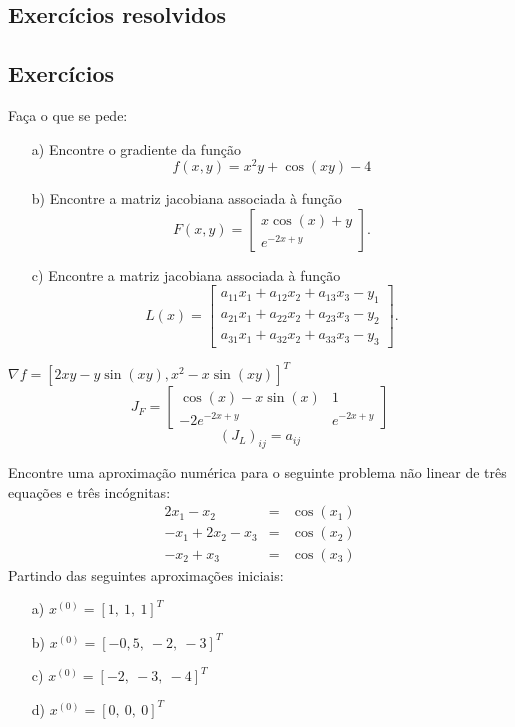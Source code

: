 
\fi

\subsection*{Exercícios resolvidos}

\construirExeresol

\subsection*{Exercícios}

\begin{exer} Faça o que se pede:
\begin{itemize}
\item[a)] Encontre o gradiente da função $$f(x,y)=x^2y+\cos(xy)-4$$
\item[b)] Encontre a matriz jacobiana associada à função
$$F(x,y)=\left[\begin{array}{c}x\cos(x)+y\\ e^{-2x+y}\end{array} \right].$$
\item[c)] Encontre a matriz jacobiana associada à função
$$L(x)=\left[\begin{array}{c}
a_{11}x_1 + a_{12}x_2 +a_{13}x_3-y_1\\
a_{21}x_1 + a_{22}x_2 +a_{23}x_3-y_2\\
a_{31}x_1 + a_{32}x_2 +a_{33}x_3-y_3
\end{array}
 \right].$$
\end{itemize}
\end{exer}
\begin{resp}
$\nabla f = [2xy-y\sin(xy), x^2-x\sin(xy)]^T$
$$J_F=\left[\begin{array}{cc}
\cos(x)-x\sin(x) & 1\\
-2e^{-2x+y} &e^{-2x+y}
\end{array}
\right]$$
$$\left(J_L\right)_{ij}=a_{ij}$$
\end{resp}

\begin{exer} Encontre uma aproximação numérica para o seguinte problema não linear de três equações e três incógnitas:
\begin{eqnarray*}
2x_1-x_2&=&\cos(x_1)\\
-x_1+2x_2-x_3&=&\cos(x_2)\\
-x_2+	x_3&=&\cos(x_3)
\end{eqnarray*}
Partindo das seguintes aproximações iniciais:
\begin{itemize}
\item[a)] $x^{(0)}=[1,~1,~1]^T$
\item[b)] $x^{(0)}=[-0,5,~-2,~-3]^T$
\item[c)] $x^{(0)}=[-2,~-3,~-4]^T$
\item[d)] $x^{(0)}=[0,~0,~0]^T$
\end{itemize}
\end{exer}
\begin{resp}
  \construirResp
\end{resp}


